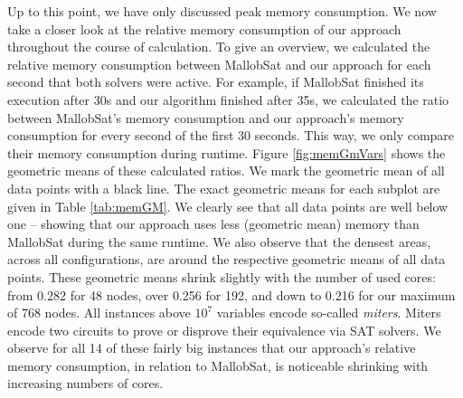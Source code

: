 \documentclass[12pt,a4paper,twoside]{scrartcl}
\numberwithin{equation}{section}
\begin{document}
\label{sec:GMs}
Up to this point, we have only discussed peak memory consumption. We now take a closer look at the relative memory consumption of our approach throughout the course of calculation. To give an overview, we calculated the relative memory consumption between MallobSat and our approach for each second that both solvers were active. For example, if MallobSat finished its execution after 30s and our algorithm finished after 35s, we calculated the ratio between MallobSat's memory consumption and our approach's memory consumption for every second of the first 30 seconds. This way, we only compare their memory consumption during runtime. Figure \ref{fig:memGmVars} shows the geometric means of these calculated ratios. We mark the geometric mean of all data points with a black line. The exact geometric means for each subplot are given in Table \ref{tab:memGM}.
We clearly see that all data points are well below one -- showing that our approach uses less (geometric mean) memory than MallobSat during the same runtime. We also observe that the densest areas, across all configurations, are around the respective geometric means of all data points. These geometric means shrink slightly with the number of used cores: from 0.282 for 48 nodes, over 0.256 for 192, and down to 0.216 for our maximum of 768 nodes.
All instances above $10^7$ variables encode so-called \textit{miters}. Miters encode two circuits to prove or disprove their equivalence via SAT solvers. We observe for all 14 of these fairly big instances that our approach's relative memory consumption, in relation to MallobSat, is noticeable shrinking with increasing numbers of cores.

\end{document}
